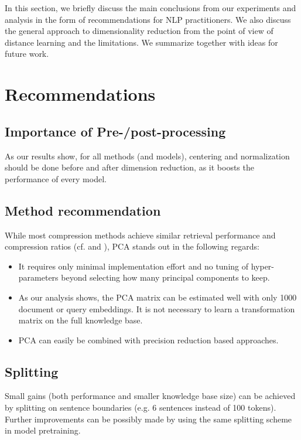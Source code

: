 In this section, we briefly discuss the main conclusions from our experiments and analysis in the form of recommendations for NLP practitioners.
We also discuss the general approach to dimensionality reduction from the point of view of distance learning and the limitations.
We summarize together with ideas for future work.

\section{Recommendations}

\subsection{Importance of Pre-/post-processing}

As our results show, for all methods (and models), centering and normalization should be done before and after dimension reduction, as it boosts the performance of every model.

\subsection{Method recommendation}

While most compression methods achieve similar retrieval performance and compression ratios (cf.  and ), PCA stands out in the following regards:

\begin{itemize}
    \item It requires only minimal implementation effort and no tuning of hyper-parameters beyond selecting how many principal components to keep.
    \item As our analysis shows, the PCA matrix can be estimated well with only 1000 document or query embeddings. It is not necessary to learn a transformation matrix on the full knowledge base.
    \item PCA can easily be combined with precision reduction based approaches.
\end{itemize}

\subsection{Splitting}

Small gains (both performance and smaller knowledge base size) can be achieved by splitting on sentence boundaries (e.g. 6 sentences instead of 100 tokens).
Further improvements can be possibly made by using the same splitting scheme in model pretraining.

